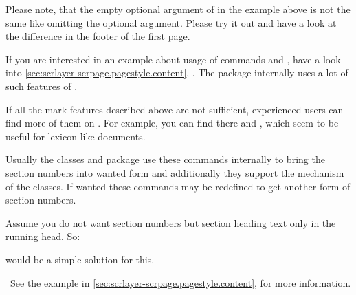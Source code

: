 Please note, that the empty optional argument of
 in the example above is not the same like omitting the optional
argument. Please try it out and have a look at the difference in the footer of
the first page.%
\else %
  \par %
  If you are interested in an example about usage of commands 
  and , have a look into
  \autoref{sec:scrlayer-scrpage.pagestyle.content},
  . The package
   internally uses a lot of such features of
  .%
\fi%
\ifnum{}\else\par
  If all the mark features described above are not sufficient, experienced
  users can find more of them on %
  . For example, you can find
  there  and , which seem to be
  useful for lexicon like documents.%
\fi
\EndIndexGroup


\begin{Declaration}
\end{Declaration}
Usually the \KOMAScript{} classes and package  use these
commands internally to bring the section numbers into wanted form and
additionally they support the  mechanism of the \KOMAScript{}
classes. If wanted these commands may be redefined to get another form of
section numbers.%
\ifCommonscrlayerscrpage%
\begin{Example}
  Assume you do not want section numbers but section heading text only in the
  running head. So:
\begin{lstcode}
  \renewcommand*{\sectionmarkformat}{}
\end{lstcode}
  would be a simple solution for this.
\end{Example}
\else %
  \ See the example in
  \autoref{sec:scrlayer-scrpage.pagestyle.content},
   for more
  information.%
\fi %
%
\EndIndexGroup



